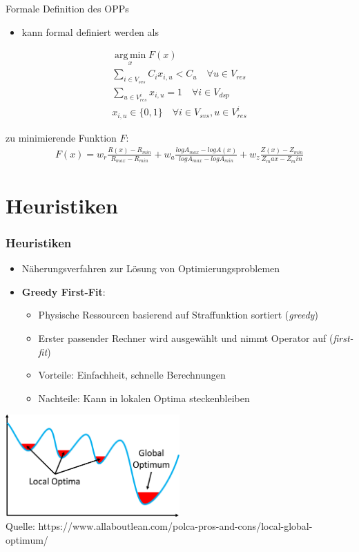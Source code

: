 \documentclass{beamer}
\begin{document}
\begin{frame}{Formale Definition des OPPs}
\begin{itemize}
    \item kann formal definiert werden als
\end{itemize}
    \[ 
   \begin{gathered}
        \operatorname*{arg\,min}_x F(x) \\
        \sum_{i \in V_{svs}} C_i x_{i,u} < C_u \quad \forall u \in V_{res} \\ %
        \sum_{u \in V_{res}^i} x_{i,u} = 1 \quad \forall i \in V_{dsp} \\ %
        x_{i,u} \in \{0,1\} \quad \forall i \in V_{svs}, u \in V_{res}^i
    \end{gathered} 
    \] 
    \item zu minimierende Funktion $F$:
    \[ 
        \begin{gathered}
            F(x) = w_r \frac{R(x) - R_{min}}{R_{max} - R_{min}} 
            + w_a \frac{log A_{max} - log A(x)}{log A_{max} - log A_{min}} 
            + w_z \frac{Z(x) - Z_{min}}{Z_max - Z_min} 
        \end{gathered}  \label{to-miminize-function}
    \] 
\end{frame}

\section{Heuristiken}
\begin{frame}
\frametitle{Heuristiken}
\begin{itemize}
    \item Näherungsverfahren zur Lösung von Optimierungsproblemen
    \item \textbf{Greedy First-Fit}: 
    \begin{itemize}
        \item Physische Ressourcen basierend auf Straffunktion sortiert (\textit{greedy})
        \item Erster passender Rechner wird ausgewählt und nimmt Operator auf (\textit{first-fit})
        \item Vorteile: Einfachheit, schnelle Berechnungen
        \item Nachteile: Kann in lokalen Optima steckenbleiben
    \end{itemize}
\end{itemize}
\begin{center}
    \includegraphics[width=0.5\textwidth]{res/Local-Global-Optimum.png} \\
    \tiny \color{gray} Quelle: https://www.allaboutlean.com/polca-pros-and-cons/local-global-optimum/
\end{center}
\end{frame}
\end{document}
